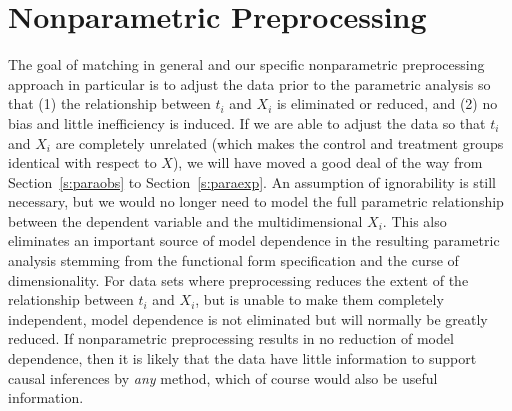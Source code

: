 \documentclass[11pt,titlepage]{article}
\begin{document}
\section{Nonparametric Preprocessing} \label{s:nonparpreproc}

The goal of matching in general and our specific nonparametric
preprocessing approach in particular is to adjust the data prior to
the parametric analysis so that (1) the relationship between $t_i$ and
$X_i$ is eliminated or reduced, and (2) no bias and little
inefficiency is induced.  If we are able to adjust the data so that
$t_i$ and $X_i$ are completely unrelated (which makes the control and
treatment groups identical with respect to $X$), we will have moved a
good deal of the way from Section~\ref{s:paraobs} to
Section~\ref{s:paraexp}.  An assumption of ignorability is still
necessary, but we would no longer need to model the full parametric
relationship between the dependent variable and the multidimensional
$X_i$.  This also eliminates an important source of model dependence
in the resulting parametric analysis stemming from the functional form
specification and the curse of dimensionality.  For data sets where
preprocessing reduces the extent of the relationship between $t_i$ and
$X_i$, but is unable to make them completely independent, model
dependence is not eliminated but will normally be greatly reduced.  If
nonparametric preprocessing results in no reduction of model
dependence, then it is likely that the data have little information to
support causal inferences by \emph{any} method, which of course would
also be useful information.
\end{document}
